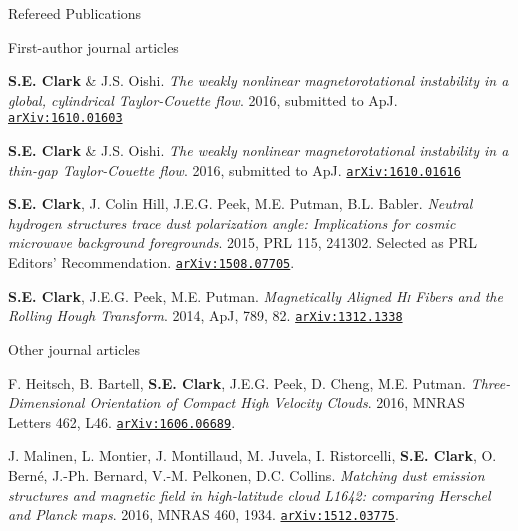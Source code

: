 \documentclass{resume_clark} %
\begin{document}
\begin{rSection}{Refereed Publications}

First-author journal articles

\begin{etaremune}

\item {\bf S.E. Clark} \& J.S. Oishi. \textit{The weakly nonlinear magnetorotational instability in a global, cylindrical Taylor-Couette flow}. 2016, submitted to ApJ. \href{https://arxiv.org/abs/1610.01603}{\tt arXiv:1610.01603}

\item {\bf S.E. Clark} \& J.S. Oishi. \textit{The weakly nonlinear magnetorotational instability in a thin-gap Taylor-Couette flow}. 2016, submitted to ApJ. \href{http://arxiv.org/abs/1610.01616}{\tt arXiv:1610.01616}

\item {\bf S.E. Clark}, J. Colin Hill, J.E.G. Peek, M.E. Putman, B.L. Babler. \textit{Neutral hydrogen structures trace dust polarization angle: Implications for cosmic microwave background foregrounds}. 2015, PRL 115, 241302. Selected as PRL Editors' Recommendation. \href{http://arxiv.org/abs/1508.07005}{\tt arXiv:1508.07705}. 

\item {\bf S.E. Clark}, J.E.G. Peek, M.E. Putman. {\em Magnetically Aligned {\textit{\textsc{Hi}}} Fibers and the Rolling Hough Transform}. 2014, {ApJ, 789, 82}. \href{http://arxiv.org/abs/1312.1338}{\tt arXiv:1312.1338}
\end{etaremune}

Other journal articles

\begin{etaremune}
\item F. Heitsch, B. Bartell, {\bf S.E. Clark}, J.E.G. Peek, D. Cheng, M.E. Putman. \textit{Three-Dimensional Orientation of Compact High Velocity Clouds}. 2016, MNRAS Letters 462, L46. \href{http://arxiv.org/abs/1606.06689}{\tt arXiv:1606.06689}.

\item J. Malinen, L. Montier, J. Montillaud, M. Juvela, I. Ristorcelli, {\bf S.E. Clark}, O. Bern\'e, J.-Ph. Bernard, V.-M. Pelkonen, D.C. Collins. \textit{Matching dust emission structures and magnetic field in high-latitude cloud L1642: comparing Herschel and Planck maps}. 2016, MNRAS 460, 1934. \href{http://arxiv.org/abs/1512.03775}{\tt arXiv:1512.03775}. 


\end{etaremune}
\end{rSection}
\end{document}
